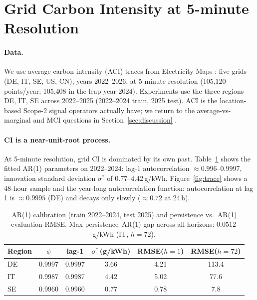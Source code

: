 \documentclass[sigconf,nonacm=false]{acmart}
\begin{document}
\section{Grid Carbon Intensity at 5-minute Resolution}
\label{sec:grid}

\paragraph{Data.}
We use average carbon intensity (ACI) traces from Electricity Maps
\cite{electricitymaps}: five grids (DE, IT, SE, US, CN), years 2022--2026, at
5-minute resolution (105{,}120 points/year; 105{,}408 in the leap year 2024).
Experiments use the three regions
DE, IT, SE across 2022--2025 (2022--2024 train, 2025 test). ACI is the
location-based Scope-2 signal operators actually have; we return to the
average-vs-marginal and MCI questions in Section~\ref{sec:discussion}
\cite{sukprasert2024avm,wiesner2025beyondmci}.

\paragraph{CI is a near-unit-root process.}
At 5-minute resolution, grid CI is dominated by its own past. Table~\ref{tab:cal}
shows the fitted AR(1) parameters on 2022--2024: lag-1 autocorrelation
$\approx0.996$--$0.9997$, innovation standard deviation $\sigma^*$ of
$0.77$--$4.42$\,g/kWh. Figure~\ref{fig:trace} shows a 48-hour sample and the
year-long autocorrelation function: autocorrelation at lag 1 is $\approx0.9995$
(DE) and decays only slowly ($\approx0.72$ at 24\,h).

\begin{table}[t]
  \caption{AR(1) calibration (train 2022--2024, test 2025) and persistence
  vs.\ AR(1) evaluation RMSE. Max persistence--AR(1) gap across all horizons:
  $0.0512$\,g/kWh (IT, $h{=}72$).}
  \label{tab:cal}
  \small
  \begin{tabular}{@{}l c c c c c@{}}
    \toprule
    Region & $\phi$ & lag-1 & $\sigma^*$\,(g/kWh) & RMSE($h{=}1$) & RMSE($h{=}72$) \\
    \midrule
    DE & 0.9997 & 0.9997 & 3.66 & 4.21 & 113.4 \\
    IT & 0.9987 & 0.9987 & 4.42 & 5.02 & 77.6 \\
    SE & 0.9960 & 0.9960 & 0.77 & 0.78 & 7.8 \\
    \bottomrule
  \end{tabular}
\end{table}
\end{document}
